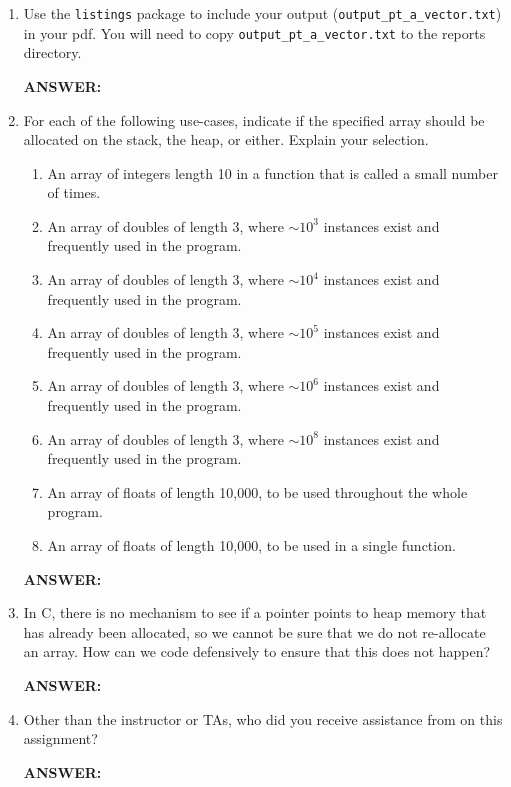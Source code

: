 \begin{enumerate}
    \item Use the \texttt{listings} package to include your output (\texttt{output\_pt\_a\_vector.txt}) in your pdf.  You will need to copy \texttt{output\_pt\_a\_vector.txt} to the reports directory.

    \textbf{ANSWER:} %
    

    \item For each of the following use-cases, indicate if the specified array should be allocated on the stack, the heap, or either.  Explain your selection.
    \begin{enumerate}
        \item An array of integers length 10 in a function that is called a small number of times.
        \item An array of doubles of length 3, where $\sim 10^3$ instances exist and frequently used in the program.
        \item An array of doubles of length 3, where $\sim 10^4$ instances exist and frequently used in the program.
        \item An array of doubles of length 3, where $\sim 10^5$ instances exist and frequently used in the program.
        \item An array of doubles of length 3, where $\sim 10^6$ instances exist and frequently used in the program.
        \item An array of doubles of length 3, where $\sim 10^8$ instances exist and frequently used in the program.
        \item An array of floats of length 10,000, to be used throughout the whole program.
        \item An array of floats of length 10,000, to be used in a single function.
    \end{enumerate}

    \textbf{ANSWER:} %
    

    \item In C, there is no mechanism to see if a pointer points to heap memory that has already been allocated, so we cannot be sure that we do not re-allocate an array.  How can we code defensively to ensure that this does not happen?

    \textbf{ANSWER:} %
    

    \item Other than the instructor or TAs, who did you receive assistance from on this assignment?
    
    \textbf{ANSWER:} %
    
\end{enumerate}

